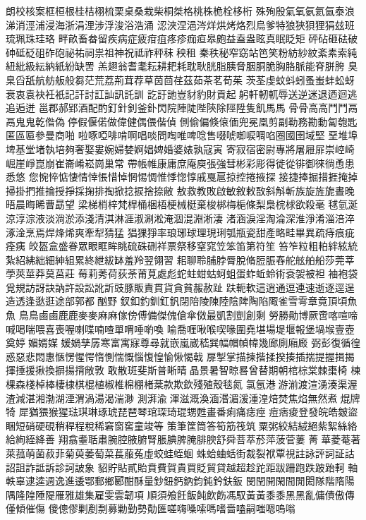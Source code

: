 朗校核案框桓根桂桔栩梳栗桌桑栽柴桐桀格桃株桅栓栘桁
殊殉殷氣氧氨氦氤泰浪涕消涇浦浸海浙涓浬涉浮浚浴浩涌
涊浹涅浥涔烊烘烤烙烈烏爹特狼狹狽狸狷玆班琉珮珠珪珞
畔畝畜畚留疾病症疲疳疽疼疹痂疸皋皰益盍盎眩真眠眨矩
砰砧砸砝破砷砥砭砠砟砲祕祐祠祟祖神祝祗祚秤秣秧租
秦秩秘窄窈站笆笑粉紡紗紋紊素索純紐紕級紜納紙紛缺罟
羔翅翁耆耄耘耕耙耗耽耿胱脂胰脅胭胴脆胸胳脈能脊胼胯
臭臬舀舐航舫舨般芻茫荒荔荊茸荐草茵茴荏茲茹茶茗荀茱
茨荃虔蚊蚪蚓蚤蚩蚌蚣蚜衰衷袁袂衽衹記訐討訌訕訊託訓
訖訏訑豈豺豹財貢起躬軒軔軏辱送逆迷退迺迴逃追逅迸
邕郡郝郢酒配酌釘針釗釜釙閃院陣陡陛陝除陘陞隻飢馬⾺
骨⾻高⾼⾾鬥鬲⿀鬼⿁乾偺偽停假偃偌做偉健偶偎偕偵
側偷偏倏偯偭兜冕凰剪副勒務勘動匐匏匙匿區匾參曼商啪
啦啄啞啡啃啊唱啖問啕唯啤唸售啜唬啣唳啁啗圈國圉域堅
堊堆埠埤基堂堵執培夠奢娶婁婉婦婪婀娼婢婚婆婊孰寇寅
寄寂宿密尉專將屠屜屝崇崆崎崛崖崢崑崩崔崙崤崧崗巢常
帶帳帷康庸庶庵庾張強彗彬彩彫得徙從徘御徠徜恿患悉悠
您惋悴惦悽情悻悵惜悼惘惕惆惟悸惚惇戚戛扈掠控捲掖探
接捷捧掘措捱掩掉掃掛捫推掄授掙採掬排掏掀捻捩捨捺敝
敖救教敗啟敏敘敕敔斜斛斬族旋旌旎晝晚晤晨晦晞曹勗望
梁梯梢梓梵桿桶梱梧梗械梃棄梭梆梅梔條梨梟梡梂欲殺毫
毬氫涎涼淳淙液淡淌淤添淺清淇淋涯淑涮淞淹涸混淵淅淒
渚涵淚淫淘淪深淮淨淆淄涪淬涿淦烹焉焊烽烯爽牽犁猜猛
猖猓猙率琅琊球理現琍瓠瓶瓷甜產略畦畢異疏痔痕疵痊痍
皎盔盒盛眷眾眼眶眸眺硫硃硎祥票祭移窒窕笠笨笛第符笙
笞笮粒粗粕絆絃統紮紹紼絀細紳組累終紲紱缽羞羚翌翎習
耜聊聆脯脖脣脫脩脰脤舂舵舷舶船莎莞莘荸莢莖莽莫莒莊
莓莉莠荷荻荼莆莧處彪蛇蛀蚶蛄蚵蛆蛋蚱蚯蛉術袞袈被袒
袖袍袋覓規訪訝訣訥許設訟訛訢豉豚販責貫貨貪貧赧赦趾
趺軛軟這逍通逗連速逝逐逕逞造透逢逖逛途部郭都酗野
釵釦釣釧釭釩閉陪陵陳陸陰陴陶陷陬雀雪雩章竟頂頃魚⿂
鳥⿃鹵⿄鹿⿅麥⿆麻⿇傢傍傅備傑傀傖傘傚最凱割剴創剩
勞勝勛博厥啻喀喧啼喊喝喘喂喜喪喔喇喋喃喳單喟唾喲喚
喻喬喱啾喉喫喙圍堯堪場堤堰報堡堝堠壹壺奠婷媚婿媒
媛媧孳孱寒富寓寐尊尋就嵌嵐崴嵇巽幅帽幀幃幾廊廁廂廄
弼彭復循徨惑惡悲悶惠愜愣惺愕惰惻惴慨惱愎惶愉愀愒戟
扉掣掌描揀揩揉揆揍插揣提握揖揭揮捶援揪換摒揚揹敞敦
敢散斑斐斯普晰晴晶景暑智晾晷曾替期朝棺棕棠棘棗椅
棟棵森棧棹棒棲棣棋棍植椒椎棉棚楮棻款欺欽殘殖殼毯氮
氯氬港游湔渡渲湧湊渠渥渣減湛湘渤湖湮渭渦湯渴湍渺
測湃渝渾滋溉渙湎湣湄湲湩湟焙焚焦焰無然煮焜牌犄
犀猶猥猴猩琺琪琳琢琥琵琶琴琯琛琦琨甥甦畫番痢痛痣痙
痘痞痠登發皖皓皴盜睏短硝硬硯稍稈程稅稀窘窗窖童竣等
策筆筐筒答筍筋筏筑粟粥絞結絨絕紫絮絲絡給絢絰絳善
翔翕耋聒肅腕腔腋腑腎脹腆脾腌腓腴舒舜菩萃菸萍菠菅萋
菁華菱菴著萊菰萌菌菽菲菊萸萎萄菜萇菔菟虛蛟蛙蛭蛔
蛛蛤蛐蛞街裁裂袱覃視註詠評詞証詁詔詛詐詆訴診訶詖象
貂貯貼貳貽賁費賀貴買貶貿貸越超趁跎距跋跚跑跌跛跆軻
軸軼辜逮逵週逸進逶鄂郵鄉郾酣酥量鈔鈕鈣鈉鈞鈍鈐鈇鈑
閔閏開閑間閒閎隊階隋陽隅隆隍陲隄雁雅雄集雇雯雲韌項
順須飧飪飯飩飲飭馮馭黃⿈黍⿉黑⿊亂傭債傲傳僅傾催傷
傻傯僇剿剷剽募勦勤勢勣匯嗟嗨嗓嗦嗎嗜嗇嗑嗣嗤嗯嗚嗡
